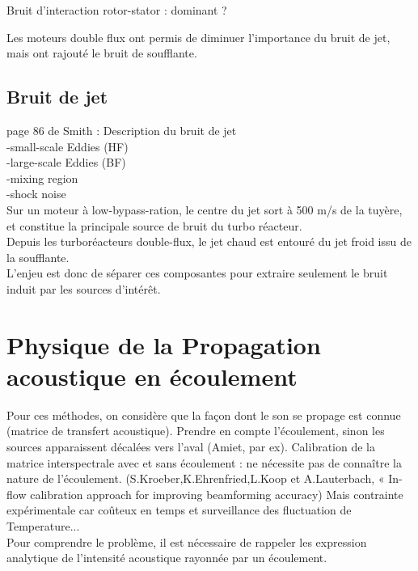 Bruit d'interaction rotor-stator : dominant ?\\

Les moteurs double flux ont permis de diminuer l'importance du bruit de jet, mais ont rajouté le bruit de soufflante.


\subsection{Bruit de jet}

page 86 de Smith : Description du bruit de jet\\
-small-scale Eddies (HF)\\
-large-scale Eddies (BF)\\
-mixing region\\
-shock noise\\
Sur un moteur à low-bypass-ration, le centre du jet sort à 500 m/s de la tuyère, et constitue la principale source de bruit du turbo réacteur.\\
Depuis les turboréacteurs double-flux, le jet chaud est entouré du jet froid issu de la soufflante.\\


L'enjeu est donc de séparer ces composantes pour extraire seulement le bruit induit par les sources d'intérêt.





\section{Physique de la Propagation acoustique en écoulement}

Pour ces méthodes, on considère que la façon dont le son se propage est connue (matrice de transfert acoustique). Prendre en compte l'écoulement, sinon les sources apparaissent décalées vers l'aval (Amiet, par ex). 
Calibration de la matrice interspectrale avec et sans écoulement : ne nécessite pas de connaître la nature de l'écoulement. (S.Kroeber,K.Ehrenfried,L.Koop et A.Lauterbach, « In-flow calibration approach for improving beamforming accuracy) Mais contrainte expérimentale car coûteux en temps et surveillance des fluctuation de Temperature...\\


Pour comprendre le problème, il est nécessaire de rappeler les expression analytique de l'intensité acoustique rayonnée par un écoulement.

